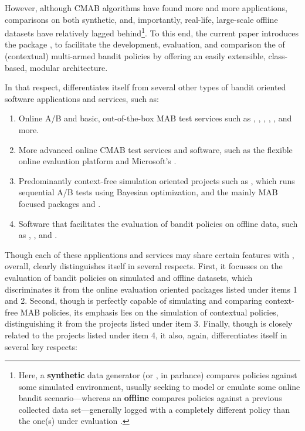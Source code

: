 \documentclass{jss}
\begin{document}
However, although CMAB algorithms have found more and more applications, comparisons on both synthetic, and, importantly, real-life, large-scale offline datasets \citep{Li2011} have relatively lagged behind\footnote{Here, a \textbf{synthetic} data generator (or , in  parlance) compares policies against some simulated environment, usually seeking to model or emulate some online bandit scenario---whereas an \textbf{offline}  compares policies against a previous collected data set---generally logged with a completely different policy than the one(s) under evaluation \citep{Li2012}.}. To this end, the current paper introduces the  package , to facilitate the development, evaluation, and comparison the of (contextual) multi-armed bandit policies by offering an easily extensible, class-based, modular architecture.

In that respect,  differentiates itself from several other types of bandit oriented software applications and services, such as:

\begin{enumerate}
          \item[1)]Online A/B and basic, out-of-the-box MAB test services such as  \citep{BibEntry2018Aug2},  \citep{BibEntry2018Aug3},  \citep{BibEntry2018Aug1},  \citep{BibEntry2018AugA},  \citep{BibEntry2018AugB}, and more.
          \item[2)]More advanced online CMAB test services and software, such as the flexible online evaluation platform  \citep{kruijswijk2018streamingbandit} and Microsoft's  \citep{Agarwal2016}.
          \item[3)]Predominantly context-free simulation oriented projects such as  \citep{2018}, which runs sequential A/B tests using Bayesian optimization, and the mainly MAB focused  packages  \citep{striatum} and  \citep{SMPyBandits}.
          \item[4)]Software that facilitates the evaluation of bandit policies on offline data, such as  \citep{Langford2007},  \citep{Hido2013}, and  \citep{Abadi2016}.
\end{enumerate}

Though each of these applications and services may share certain features with , overall,  clearly distinguishes itself in several respects.  First, it focusses on the evaluation of bandit policies on simulated and offline datasets, which discriminates it from the online evaluation oriented packages listed under items 1 and 2. Second, though  is perfectly capable of simulating and comparing context-free MAB policies, its emphasis lies on the simulation of contextual policies, distinguishing it from the projects listed under item 3. Finally, though  is closely related to the projects listed under item 4, it also, again, differentiates itself in several key respects:
\end{document}
